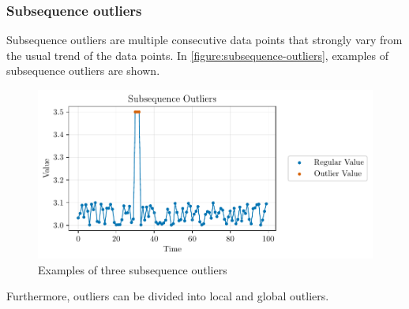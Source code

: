 \subsubsection{Subsequence outliers}
Subsequence outliers are multiple consecutive data points that strongly vary from the usual trend of the data points. \cite{blazquez-garciaReviewOutlierAnomaly2020} In \autoref{figure:subsequence-outliers}, examples of subsequence outliers are shown.
\newline\newline
\begin{figure}[h]
  \centering
  \includegraphics{./plots/pdfs/subsequence_outliers.pdf}
  \caption{Examples of three subsequence outliers}
  \label{figure:subsequence-outliers}
\end{figure}
Furthermore, outliers can be divided into local and global outliers. 
